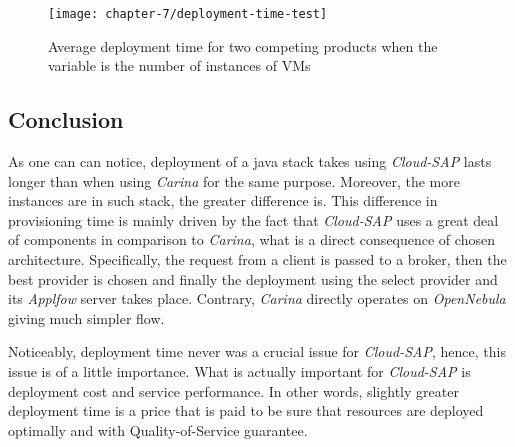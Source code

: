 \begin{figure}[!ht]
  \begin{center}
    \texttt{[image: chapter-7/deployment-time-test]}
  \end{center}
  \caption{Average deployment time for two competing products when the variable is the number of instances of VMs}
  \label{ch7:deployment-time-test}
\end{figure}

\subsection*{Conclusion}
As one can can notice, deployment of a java stack takes using \emph{Cloud-SAP} lasts longer than when using \emph{Carina} for the same purpose. Moreover, the more instances are in such stack, the greater difference is. This difference in provisioning time is mainly driven by the fact that \emph{Cloud-SAP} uses a great deal of components in comparison to \emph{Carina}, what is a direct consequence of chosen architecture. Specifically, the request from a client is passed to a broker, then the best provider is chosen and finally the deployment using the select provider and its \emph{Applfow} server takes place. Contrary, \emph{Carina} directly operates on \emph{OpenNebula} giving much simpler flow.

Noticeably, deployment time never was a crucial issue for \emph{Cloud-SAP}, hence, this issue is of a little importance. What is actually important for \emph{Cloud-SAP} is deployment cost and service performance. In other words, slightly greater deployment time is a price that is paid to be sure that resources are deployed optimally and with Quality-of-Service guarantee.

